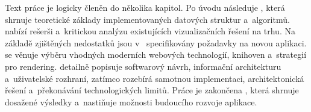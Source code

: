 \pagebreak
Text práce je logicky členěn do několika kapitol.
Po úvodu následuje , která shrnuje teoretické základy implementovaných datových struktur a~algoritmů.
 nabízí rešerši a~kritickou analýzu existujících vizualizačních řešení na trhu.
Na základě zjištěných nedostatků jsou v~ specifikovány požadavky na novou aplikaci.
 se věnuje výběru vhodných moderních webových technologií, knihoven a~strategií pro rendering.
 detailně popisuje softwarový návrh, informační architekturu a~uživatelské rozhraní, zatímco  rozebírá samotnou implementaci, architektonická řešení a~překonávání technologických limitů.
Práce je zakončena , která shrnuje dosažené výsledky a~nastiňuje možnosti budoucího rozvoje aplikace.

